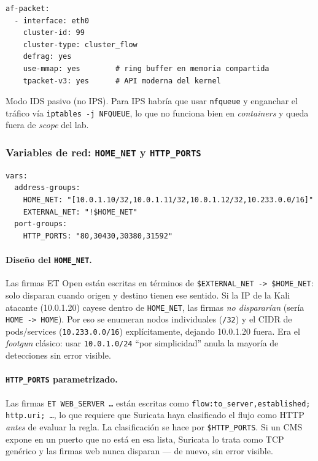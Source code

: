 \begin{lstlisting}[style=yaml]
af-packet:
  - interface: eth0
    cluster-id: 99
    cluster-type: cluster_flow
    defrag: yes
    use-mmap: yes        # ring buffer en memoria compartida
    tpacket-v3: yes      # API moderna del kernel
\end{lstlisting}

Modo IDS pasivo (no IPS). Para IPS habría que usar \texttt{nfqueue} y enganchar el tráfico vía \texttt{iptables -j NFQUEUE}, lo que no funciona bien en \emph{containers} y queda fuera de \emph{scope} del lab.

\subsubsection{Variables de red: \texttt{HOME\_NET} y \texttt{HTTP\_PORTS}}

\begin{lstlisting}[style=yaml]
vars:
  address-groups:
    HOME_NET: "[10.0.1.10/32,10.0.1.11/32,10.0.1.12/32,10.233.0.0/16]"
    EXTERNAL_NET: "!$HOME_NET"
  port-groups:
    HTTP_PORTS: "80,30430,30380,31592"
\end{lstlisting}

\paragraph{Diseño del \texttt{HOME\_NET}.} Las firmas ET Open están escritas en términos de \texttt{\$EXTERNAL\_NET -> \$HOME\_NET}: solo disparan cuando origen y destino tienen ese sentido. Si la IP de la Kali atacante (10.0.1.20) cayese dentro de \texttt{HOME\_NET}, las firmas \emph{no dispararían} (sería \texttt{HOME -> HOME}). Por eso se enumeran nodos individuales (\texttt{/32}) y el CIDR de pods/services (\texttt{10.233.0.0/16}) explícitamente, dejando 10.0.1.20 fuera. Era el \emph{footgun} clásico: usar \texttt{10.0.1.0/24} ``por simplicidad'' anula la mayoría de detecciones sin error visible.

\paragraph{\texttt{HTTP\_PORTS} parametrizado.} Las firmas \texttt{ET WEB\_SERVER \dots} están escritas como \texttt{flow:to\_server,established; http.uri; \dots}, lo que requiere que Suricata haya clasificado el flujo como HTTP \emph{antes} de evaluar la regla. La clasificación se hace por \texttt{\$HTTP\_PORTS}. Si un CMS expone en un puerto que no está en esa lista, Suricata lo trata como TCP genérico y las firmas web nunca disparan --- de nuevo, sin error visible.


